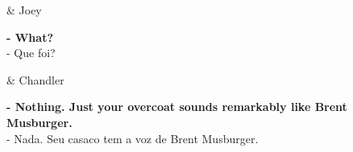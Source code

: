 \begin{tcolorbox}[enhanced,center upper,
    drop fuzzy shadow southeast, boxrule=0.3pt,
    lower separated=false, breakable,
    colframe=black!30!dialogoBorder,colback=white]
\begin{minipage}[c]{0.16\linewidth}
   & \centering \scriptsize{Joey}
\end{minipage}
\hfill
\begin{minipage}[c]{0.8\linewidth}
  \textbf{- What?}\\
  - Que foi?
\end{minipage}

\medskip
\begin{minipage}[c]{0.16\linewidth}
   & \centering \scriptsize{Chandler}
\end{minipage}
\hfill
\begin{minipage}[c]{0.8\linewidth}
  \textbf{- Nothing. Just your overcoat sounds remarkably like Brent Musburger.}\\
  - Nada. Seu casaco tem a voz de Brent Musburger.
\end{minipage}
\end{tcolorbox}

